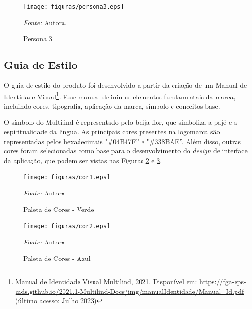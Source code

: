\pagebreak

\begin{figure}[h!]
	\centering
	\caption{Persona 3}
	\begin{adjustbox}{center}
		\texttt{[image: figuras/persona3.eps]}
	\end{adjustbox}
	\begin{tablenotes}[flushleft]
		\centering
		\item \textit{Fonte:} Autora.
	\end{tablenotes}
	\label{fig15}
\end{figure}

\subsection{Guia de Estilo}
\label{Guia de Estilo}
O guia de estilo do produto foi desenvolvido a partir da criação de um Manual de Identidade Visual\footnote{Manual de Identidade Visual Multilind, 2021. Disponível
em: \url{https://fga-eps-mds.github.io/2021.1-Multilind-Docs/img/manualIdentidade/Manual_Id.pdf} (último acesso: Julho 2023)}. Esse manual definiu os elementos fundamentais da marca, incluindo cores, tipografia, aplicação da marca, símbolo e conceitos base.

O símbolo do Multilind é representado pelo beija-flor, que simboliza a pajé e a espiritualidade da língua. As principais cores presentes na logomarca são representadas pelos hexadecimais "\#04B47F'' e "\#338BAE''. Além disso, outras cores foram selecionadas 
como base para o desenvolvimento do \textit{design} de interface da aplicação, que podem ser vistas nas Figuras \ref{fig16} e \ref{fig17}.

\begin{figure}[h!]
	\centering
	\caption{Paleta de Cores - Verde}
	\begin{adjustbox}{center}
		\texttt{[image: figuras/cor1.eps]}
	\end{adjustbox}
	\begin{tablenotes}[flushleft]
		\centering
		\item \textit{Fonte:} Autora.
	\end{tablenotes}
	\label{fig16}
\end{figure}

\begin{figure}[h!]
	\centering
	\caption{Paleta de Cores - Azul}
	\begin{adjustbox}{center}
		\texttt{[image: figuras/cor2.eps]}
	\end{adjustbox}
	\begin{tablenotes}[flushleft]
		\centering
		\item \textit{Fonte:} Autora.
	\end{tablenotes}
	\label{fig17}
\end{figure}

